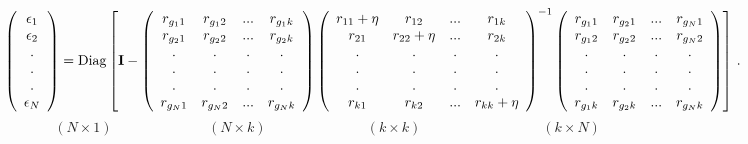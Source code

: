 \documentclass[
]{agujournal2019}
\begin{document}
\begingroup\makeatletter{}\check@mathfonts\[\left(\begin{array}{ccc}
  \epsilon_{1} \\
  \epsilon_{2} \\
  . \\
  . \\
  . \\
  \epsilon_{N} \\
     \end{array}\right)=\text{Diag}\left[
     {\textbf I}-
\left(\begin{array}{ccccc}
  r_{g_11} & r_{g_12} &... &  r_{g_1k}\\
  r_{g_21} & r_{g_22} &... &  r_{g_2k}\\
  . & . & . & . \\
  . & . & . & . \\
  . & . & . & . \\
  r_{g_N1} & r_{g_N2} & ... & r_{g_Nk}\\
     \end{array}\right)
 \left(\begin{array}{ccccc}
  r_{11}+\eta & r_{12} &... &  r_{1k}\\
  r_{21} & r_{22}+\eta &... &  r_{2k}\\
  . & . & . & . \\
  . & . & . & . \\
  . & . & . & . \\
  r_{k1} & r_{k2} & ... & r_{kk}+\eta\\
     \end{array}\right)^{-1}
\left(\begin{array}{ccccc}
  r_{g_11} & r_{g_21} &... &  r_{g_N1}\\
  r_{g_12} & r_{g_22} &... &  r_{g_N2}\\
  . & . & . & . \\
  . & . & . & . \\
  . & . & . & . \\
  r_{g_1k} & r_{g_2k} & ... & r_{g_Nk}\\
     \end{array}\right) \right]
     \,.\]\endgroup
\[\left( N \times 1 \right)\,\,\,\,\,\,\,\,\,\,\,\,\,\,\,\,\,\,\,\,\,\,\,\,\,\,\,\,\,\,\,\,\,\,\,\,\,\,\,\,\,
  \left( N \times k \right)\,\,\,\,\,\,\,\,\,\,\,\,\,\,\,\,\,\,\,\,\,\,\,\,\,\,\,\,\,\,\,\,\,\,\,
  \,\,\,\,\,\,\,\,\left( k \times k \right)\,\,\,\,\,\,\,\,\,\,\,\,\,\,\,\,\,\,\,\,\,\,\,\,\,\,\,\,\,\,\,\,\,\,\,\,\,\,\,\,\,\,\,\,\,\,\,\,\,\,\,\,
  \left( k \times N \right)\,\,\,\,\,\,\,\,\,\,\,\,\,\,\,\,\,\,\,\,\,\,\,\,\,\,\,\,\,\,\,\,\,\,\,\,\,\,\,\]
\end{document}
